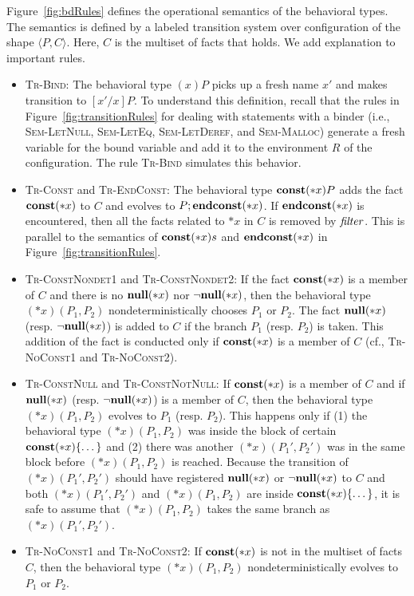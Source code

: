 Figure~\ref{fig:bdRules} defines the operational semantics of the
behavioral types.  The semantics is defined by a labeled transition
system over configuration of the shape $\langle P, C \rangle$.  Here,
$C$ is the multiset of facts that holds.  We add explanation to
important rules.
\begin{itemize}
 \item \textsc{Tr-Bind}: The behavioral type $(x)P$ picks up a fresh
       name $x'$ and makes transition to $[x'/x]P$.  To understand this
       definition, recall that the rules in
       Figure~\ref{fig:transitionRules} for dealing with statements with
       a binder (i.e., \textsc{Sem-LetNull}, \textsc{Sem-LetEq},
       \textsc{Sem-LetDeref}, and \textsc{Sem-Malloc}) generate a fresh
       variable for the bound variable and add it to the environment $R$
       of the configuration.  The rule \textsc{Tr-Bind} simulates this
       behavior.
 \item \textsc{Tr-Const} and \textsc{Tr-EndConst}: The behavioral type
       $\mathbf{const}(*x)P$ adds the fact $\mathbf{const}(*x)$ to $C$ and evolves to
       $P;\mathbf{endconst}(*x)$.  If $\mathbf{endconst}(*x)$ is encountered, then all the facts
       related to $*x$ in $C$ is removed by $\mathit{filter}$.  This is parallel
       to the semantics of $\mathbf{const}(*x)s$ and $\mathbf{endconst}(*x)$ in
       Figure~\ref{fig:transitionRules}.
 \item \textsc{Tr-ConstNondet1} and \textsc{Tr-ConstNondet2}: If the
       fact $\mathbf{const}(*x)$ is a member of $C$ and there is no $\mathbf{null}(*x)$
       nor $\neg\mathbf{null}(*x)$, then the behavioral type $(*x)(P_1,P_2)$
       nondeterministically chooses $P_1$ or $P_2$.  The fact
       $\mathbf{null}(*x)$ (resp. $\neg\mathbf{null}(*x)$) is added to $C$ if the branch
       $P_1$ (resp. $P_2$) is taken.  This addition of the fact is
       conducted only if $\mathbf{const}(*x)$ is a member of $C$ (cf.,
       \textsc{Tr-NoConst1} and \textsc{Tr-NoConst2}).
 \item \textsc{Tr-ConstNull} and \textsc{Tr-ConstNotNull}: If
       $\mathbf{const}(*x)$ is a member of $C$ and if $\mathbf{null}(*x)$ (resp.
       $\neg\mathbf{null}(*x)$) is a member of $C$, then the behavioral type
       $(*x)(P_1,P_2)$ evolves to $P_1$ (resp. $P_2$).  This happens
       only if (1) the behavioral type $(*x)(P_1,P_2)$ was inside the
       block of certain $\mathbf{const}(*x)\{\dots\}$ and (2) there was another
       $(*x)(P_1',P_2')$ was in the same block before $(*x)(P_1,P_2)$ is
       reached.  Because the transition of $(*x)(P_1',P_2')$ should have
       registered $\mathbf{null}(*x)$ or $\neg\mathbf{null}(*x)$ to $C$ and both
       $(*x)(P_1',P_2')$ and $(*x)(P_1,P_2)$ are inside
       $\mathbf{const}(*x)\{\dots\}$, it is safe to assume that $(*x)(P_1,P_2)$
       takes the same branch as $(*x)(P_1',P_2')$.
 \item \textsc{Tr-NoConst1} and \textsc{Tr-NoConst2}: If $\mathbf{const}(*x)$ is
       not in the multiset of facts $C$, then the behavioral type
       $(*x)(P_1,P_2)$ nondeterministically evolves to $P_1$ or $P_2$.
\end{itemize}

